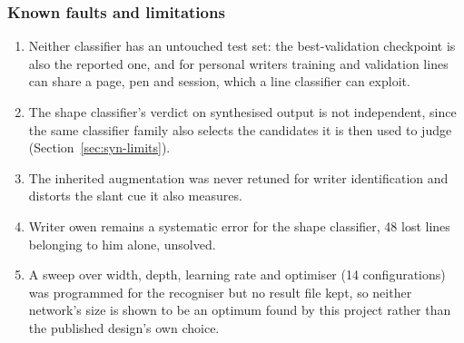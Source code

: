 \subsubsection{Known faults and limitations}
\label{sec:wid-limits}

\begin{enumerate}\setlength{\itemsep}{0pt}\setlength{\parskip}{0pt}
\item Neither classifier has an untouched test set: the best-validation checkpoint is also the reported one, and for personal writers training and validation lines can share a page, pen and session, which a line classifier can exploit.
\item The shape classifier's verdict on synthesised output is not independent, since the same classifier family also selects the candidates it is then used to judge (Section~\ref{sec:syn-limits}).
\item The inherited augmentation was never retuned for writer identification and distorts the slant cue it also measures.
\item Writer owen remains a systematic error for the shape classifier, 48 lost lines belonging to him alone, unsolved.
\item A sweep over width, depth, learning rate and optimiser (14 configurations) was programmed for the recogniser but no result file kept, so neither network's size is shown to be an optimum found by this project rather than the published design's own choice.
\end{enumerate}

